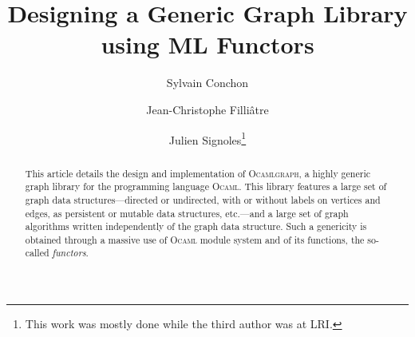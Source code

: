 \documentclass[tfpsymp]{tfp05symp}
\newcommand{\ocamlgraph}{\textsc{Ocamlgraph}\xspace}
\newcommand{\ocaml}{\textsc{Ocaml}\xspace}
\begin{document}


\title{Designing a Generic Graph Library \\ using ML Functors}


\author
    {Sylvain Conchon \and 
     Jean-Christophe Filli\^atre \and 
     Julien Signoles\protect\footnote[1]{This work was mostly done
    while the third author was at LRI.}}





\maketitle

\begin{abstract}
  This article details the design and implementation of \ocamlgraph, a highly
  generic graph library for the programming language \ocaml. This
  library features a large set of graph data structures---directed or
  undirected, with or without labels on vertices and edges, as persistent
  or mutable data structures, etc.---and a large set of graph
  algorithms written independently of the graph data structure. Such a
  genericity is obtained through a massive use of \ocaml module system
  and of its functions, the so-called \emph{functors}.
\end{abstract}


\end{document}
